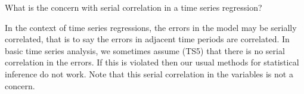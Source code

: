 
\question What is the concern with serial correlation in a time series regression?

\begin{solution}
  In the context of time series regressions, the errors in the model may be serially correlated, that 
  is to say the errors in adjacent time periods are correlated. In basic time series analysis, we sometimes 
  assume (TS5) that there is no serial correlation in the errors. If this is violated then our usual methods 
  for statistical inference do not work. Note that this serial correlation in the variables is not a concern.
\end{solution}

